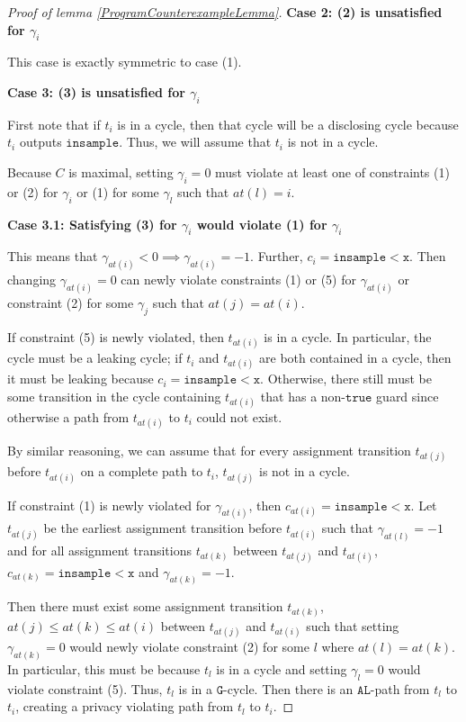 \documentclass[12pt]{article}
\newcommand{\lguard}[1][x]{\texttt{insample} < #1}
\theoremstyle{definition}
\begin{document}
\begin{proof}[Proof of lemma \ref{ProgramCounterexampleLemma}]
    \textbf{Case 2: (2) is unsatisfied for $\gamma_i$}

    This case is exactly symmetric to case (1).

    \textbf{Case 3: (3) is unsatisfied for $\gamma_i$}

    First note that if $t_i$ is in a cycle, then that cycle will be a disclosing cycle because $t_i$ outputs $\texttt{insample}$. Thus, we will assume that $t_i$ is not in a cycle.

    Because $C$ is maximal, setting $\gamma_i=0$ must violate at least one of constraints (1) or (2) for $\gamma_i$ or (1) for some $\gamma_l$ such that $at(l) = i$.

    \textbf{Case 3.1: Satisfying (3) for $\gamma_i$ would violate (1) for $\gamma_i$}

    This means that $\gamma_{at(i)}<0\implies \gamma_{at(i)} = -1$. Further, $c_i = \lguard[\texttt{x}]$. Then changing $\gamma_{at(i)}=0$ can newly violate constraints (1) or (5) for $\gamma_{at(i)}$ or constraint (2) for some $\gamma_j$ such that $at(j) = at(i)$.

    If constraint (5) is newly violated, then $t_{at(i)}$ is in a cycle. In particular, the cycle must be a leaking cycle; if $t_i$ and $t_{at(i)}$ are both contained in a cycle, then it must be leaking because $c_i = \lguard[\texttt{x}]$. Otherwise, there still must be some transition in the cycle containing $t_{at(i)}$ that has a non-$\texttt{true}$ guard since otherwise a path from $t_{at(i)}$ to $t_i$ could not exist. 

    By similar reasoning, we can assume that for every assignment transition $t_{at(j)}$before $t_{at(i)}$ on a complete path to $t_i$, $t_{at(j)}$ is not in a cycle. 

    If constraint (1) is newly violated for $\gamma_{at(i)}$, then $c_{at(i)} = \lguard[\texttt{x}]$. Let $t_{at(j)}$ be the earliest assignment transition before $t_{at(i)}$ such that $\gamma_{at(l)} = -1$ and for all assignment transitions $t_{at(k)}$ between $t_{at(j)}$ and $t_{at(i)}$, $c_{at(k)} = \lguard[\texttt{x}]$ and $\gamma_{at(k)} = -1$. 
    
    Then there must exist some assignment transition $t_{at(k)}$, $at(j)\leq at(k)\leq at(i)$ between $t_{at(j)}$ and $t_{at(i)}$ such that setting $\gamma_{at(k)} = 0$ would newly violate constraint (2) for some $l$ where $at(l) = at(k)$. In particular, this must be because $t_l$ is in a cycle and setting $\gamma_l = 0$ would violate constraint (5). Thus, $t_l$ is in a $\texttt{G}$-cycle. Then there is an $\texttt{AL}$-path from $t_l$ to $t_i$, creating a privacy violating path from $t_l$ to $t_i$. 


\end{proof}
\end{document}
